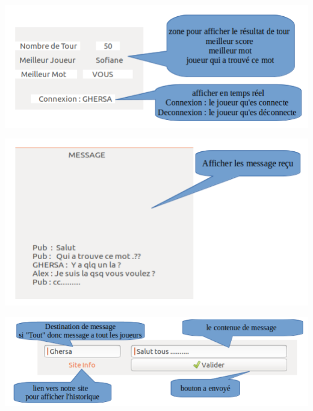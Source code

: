 \documentclass[french]{article}
\begin{document}
\includegraphics[width=1\textwidth]{images/5.png}
    
\includegraphics[width=1\textwidth]{images/6.png}
    
\includegraphics[width=1\textwidth]{images/7.png}
    
\end{document}

